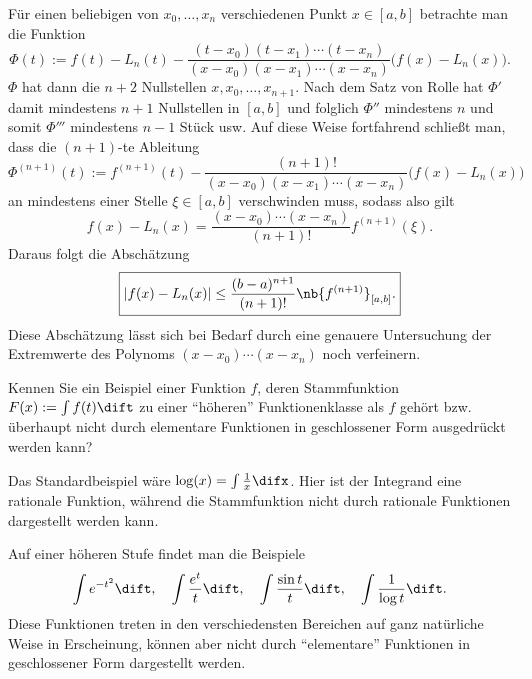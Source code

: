   \begin{antwort}
    Für einen beliebigen von $x_0, \ldots, x_n$ verschiedenen Punkt 
    $x \in [a,b]$ betrachte man die Funktion
    \[
    \Phi(t) := f(t)-L_n(t) - 
    \frac{ (t-x_0) (t-x_1) \cdots (t-x_n) }{ (x-x_0)(x-x_1) \cdots (x-x_n ) }
    \bigl( f(x) - L_n(x) \bigr). 
    \]
    $\Phi$ hat dann die $n+2$ Nullstellen $x, x_0, \ldots, x_{n+1}$. 
    Nach dem Satz von Rolle hat $\Phi'$ damit mindestens 
    $n+1$ Nullstellen in $[a,b]$ und folglich $\Phi''$ 
    mindestens $n$ und somit $\Phi'''$ mindestens $n-1$ Stück usw.
    Auf diese Weise fortfahrend schließt man, dass 
    die $(n+1)$-te Ableitung 
    \[
    \Phi^{(n+1)}(t) := f^{(n+1)}(t) - 
    \frac{ (n+1)! }{ (x-x_0) (x-x_1) \cdots (x-x_n) }
    \bigl( f(x) - L_n(x) \bigr) 
    \]
    an mindestens einer Stelle $\xi \in [a,b]$ verschwinden muss, sodass 
    also gilt
    \[
    f(x) - L_n (x) = \frac{(x-x_0) \cdots (x-x_n)}{ (n+1)! } f^{(n+1)}( \xi ).
    \]
    Daraus folgt die Abschätzung  
    \[
    \boxed{
      \left| f(x) - L_n (x) \right|  
      \le \frac{(b-a)^{n+1}}{ (n+1)! } \nb{f^{(n+1)}}_{[a,b]}.
    }
    \]
    Diese Abschätzung 
    lässt sich bei Bedarf durch eine genauere Untersuchung 
    der Extremwerte des Polynoms 
    $(x-x_0) \cdots (x-x_n)$ noch verfeinern. 
    \AntEnd
  \end{antwort}

  \begin{frage}\label{06_elementf}
    Kennen Sie ein Beispiel einer Funktion $f$, deren Stammfunktion 
    $F(x) := \int f(t) \dift$ zu einer "`höheren"' Funktionenklasse als 
    $f$ gehört bzw. überhaupt nicht durch elementare Funktionen in 
    geschlossener Form ausgedrückt werden kann?
  \end{frage}

  \begin{antwort}
    
    Das Standardbeispiel wäre $\log(x) = \int \frac{1}{x}\difx$. 
    Hier ist der Integrand eine rationale Funktion, während die Stammfunktion 
    nicht durch rationale Funktionen dargestellt werden kann.

    Auf einer höheren Stufe findet man die Beispiele
    \[
    \int e^{-t^2} \dift, \quad 
    \int \frac{e^t}{t} \dift, \quad 
    \int \frac{\sin t}{t} \dift, \quad 
    \int \frac{1}{\log t}\dift.
    \]
    Diese Funktionen treten in den verschiedensten Bereichen auf ganz natürliche 
    Weise in Erscheinung, können aber nicht durch "`elementare"' Funktionen 
    in geschlossener Form dargestellt werden. 
    \AntEnd 
  \end{antwort} 

